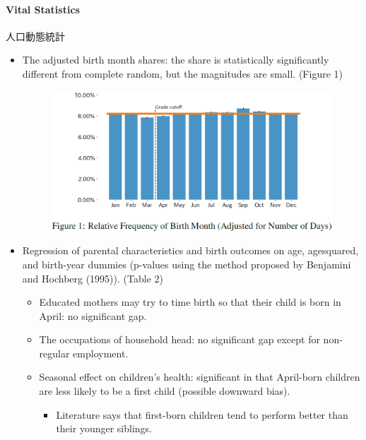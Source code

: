 \documentclass[../root]{subfiles}
\begin{document}
    \paragraph{Vital Statistics} 人口動態統計

    \begin{itemize}
      \item The adjusted birth month shares: the share is statistically significantly different from complete random, but the magnitudes are small. (Figure 1)
      \begin{figure}[ht]
        \centering
        \includegraphics[scale = .6]{0904tanji/F1}
      \end{figure}
      \item Regression of parental characteristics and birth outcomes on age, agesquared, and birth-year dummies (p-values using the method proposed by Benjamini and Hochberg (1995)). (Table 2)
      \begin{itemize}
        \item Educated mothers may try to time birth so that their child is born in April: no significant gap.
        \item The occupations of household head: no significant gap except for non-regular employment.
        \item Seasonal effect on children's health: significant in that April-born children are less likely to be a first child (possible downward bias).
        \begin{itemize}
          \item Literature says that first-born children tend to perform better than their younger siblings.
        \end{itemize}
      \end{itemize}
      \begin{figure}[ht]
        \centering

\end{figure}
\end{itemize}
\end{document}
